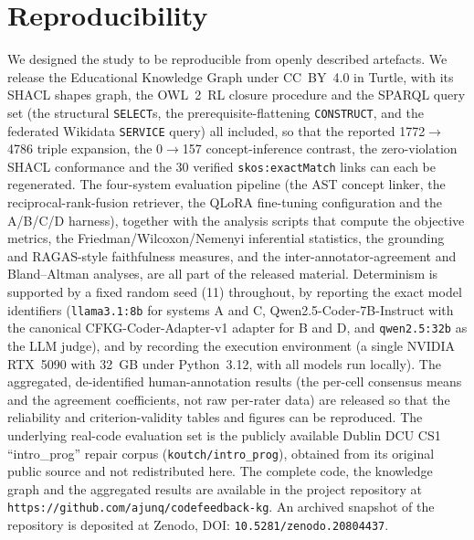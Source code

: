 \documentclass[sageh]{sagej}
\begin{document}
\section{Reproducibility}
We designed the study to be reproducible from openly described artefacts. We release the Educational Knowledge Graph under CC~BY~4.0 in Turtle, with its SHACL shapes graph, the OWL~2~RL closure procedure and the SPARQL query set (the structural \texttt{SELECT}s, the prerequisite-flattening \texttt{CONSTRUCT}, and the federated Wikidata \texttt{SERVICE} query) all included, so that the reported 1772$\rightarrow$4786 triple expansion, the 0$\rightarrow$157 concept-inference contrast, the zero-violation SHACL conformance and the 30 verified \texttt{skos:exactMatch} links can each be regenerated. The four-system evaluation pipeline (the AST concept linker, the reciprocal-rank-fusion retriever, the QLoRA fine-tuning configuration and the A/B/C/D harness), together with the analysis scripts that compute the objective metrics, the Friedman/Wilcoxon/Nemenyi inferential statistics, the grounding and RAGAS-style faithfulness measures, and the inter-annotator-agreement and Bland--Altman analyses, are all part of the released material. Determinism is supported by a fixed random seed (11) throughout, by reporting the exact model identifiers (\texttt{llama3.1:8b} for systems A and C, Qwen2.5-Coder-7B-Instruct with the canonical CFKG-Coder-Adapter-v1 adapter for B and D, and \texttt{qwen2.5:32b} as the LLM judge), and by recording the execution environment (a single NVIDIA RTX~5090 with 32~GB under Python~3.12, with all models run locally). The aggregated, de-identified human-annotation results (the per-cell consensus means and the agreement coefficients, not raw per-rater data) are released so that the reliability and criterion-validity tables and figures can be reproduced. The underlying real-code evaluation set is the publicly available Dublin DCU CS1 ``intro\_prog'' repair corpus (\texttt{koutch/intro\_prog}), obtained from its original public source and not redistributed here. The complete code, the knowledge graph and the aggregated results are available in the project repository at \texttt{https://github.com/ajunq/codefeedback-kg}. An archived snapshot of the repository is deposited at Zenodo, DOI: \texttt{10.5281/zenodo.20804437}.

\end{document}
